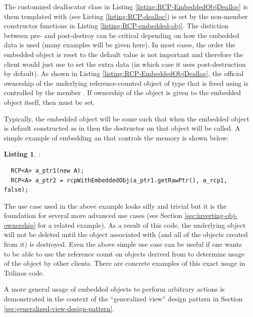 \documentclass[pdf,ps2pdf,11pt]{SANDreport}
\newtheorem{listing}{Listing}
\begin{document}
The customized deallocator class in Listing
{}\ref{listing:RCP-EmbeddedObjDealloc} is them templated with
{} (see Listing {}\ref{listing:RCP-dealloc}) is set
by the non-member constructor functions in Listing
{}\ref{listing:RCP-embedded-obj}.  The distiction between pre- and
post-destroy can be critical depending on how the embedded data is
used (many examples will be given here).  In most cases, the order the
embedded object is reset to the default value is not important and
therefore the client would just use {} to
set the extra data (in which case it uses post-destruction by
default).  As shown in Listing {}\ref{listing:RCP-EmbeddedObjDealloc},
the official ownership of the underlying reference-counted object of
type {} that is freed using {} is controlled by
the {} member {}.  If ownership of the
object is given to the embedded object itself, then
{} must be set.

Typically, the embedded object will be some {} such that
when the embedded object is default constructed as in
{} then the destructor on that object
will be called.  A simple example of embedding an {} that
controls the memory is shown below:

\begin{listing}: \\
{\small\begin{verbatim}
  RCP<A> a_ptr1(new A);
  RCP<A> a_ptr2 = rcpWithEmbeddedObj(a_ptr1.getRawPtr(), a_rcp1, false);
\end{verbatim}}
\end{listing}

The use case used in the above example looks silly and trivial but it
is the foundation for several more advanced use cases (see Section
{}\ref{sec:inverting-obj-ownership} for a related example).  As a
result of this code, the underlying {} object will not be
deleted until the {} object associated with
{} (and all of the {} objects created from it)
is destroyed.  Even the above simple use case can be useful if one
wants to be able to use the reference count on {} objects
derived from {} to determine usage of the object by other
clients.  There are concrete examples of this exact usage in Trilinos
code.

A more general usage of embedded objects to perform arbitrary actions
is demonstrated in the context of the ``generalized view'' design
pattern in Section {}\ref{sec:generalized-view-design-pattern}.
\end{document}
